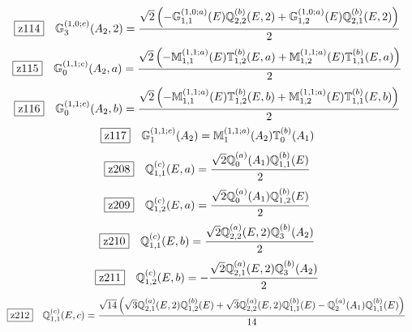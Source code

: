 \documentclass[fleqn,10pt,landscape]{jsarticle}
\begin{document}
\begin{dmath*}
\hspace*{3mm}\fbox{z114}\quad \mathbb{G}_{3}^{(1,0;c)}(A_{2},2)=\frac{\sqrt{2} \left(- \mathbb{G}_{1,1}^{(1,0;a)}(E) \mathbb{Q}_{2,2}^{(b)}(E,2) + \mathbb{G}_{1,2}^{(1,0;a)}(E) \mathbb{Q}_{2,1}^{(b)}(E,2)\right)}{2}
\end{dmath*}
\begin{dmath*}
\hspace*{3mm}\fbox{z115}\quad \mathbb{G}_{0}^{(1,1;c)}(A_{2},a)=\frac{\sqrt{2} \left(- \mathbb{M}_{1,1}^{(1,1;a)}(E) \mathbb{T}_{1,2}^{(b)}(E,a) + \mathbb{M}_{1,2}^{(1,1;a)}(E) \mathbb{T}_{1,1}^{(b)}(E,a)\right)}{2}
\end{dmath*}
\begin{dmath*}
\hspace*{3mm}\fbox{z116}\quad \mathbb{G}_{0}^{(1,1;c)}(A_{2},b)=\frac{\sqrt{2} \left(- \mathbb{M}_{1,1}^{(1,1;a)}(E) \mathbb{T}_{1,2}^{(b)}(E,b) + \mathbb{M}_{1,2}^{(1,1;a)}(E) \mathbb{T}_{1,1}^{(b)}(E,b)\right)}{2}
\end{dmath*}
\begin{dmath*}
\hspace*{3mm}\fbox{z117}\quad \mathbb{G}_{1}^{(1,1;c)}(A_{2})=\mathbb{M}_{1}^{(1,1;a)}(A_{2}) \mathbb{T}_{0}^{(b)}(A_{1})
\end{dmath*}
\begin{dmath*}
\hspace*{3mm}\fbox{z208}\quad \mathbb{Q}_{1,1}^{(c)}(E,a)=\frac{\sqrt{2} \mathbb{Q}_{0}^{(a)}(A_{1}) \mathbb{Q}_{1,1}^{(b)}(E)}{2}
\end{dmath*}
\begin{dmath*}
\hspace*{3mm}\fbox{z209}\quad \mathbb{Q}_{1,2}^{(c)}(E,a)=\frac{\sqrt{2} \mathbb{Q}_{0}^{(a)}(A_{1}) \mathbb{Q}_{1,2}^{(b)}(E)}{2}
\end{dmath*}
\begin{dmath*}
\hspace*{3mm}\fbox{z210}\quad \mathbb{Q}_{1,1}^{(c)}(E,b)=\frac{\sqrt{2} \mathbb{Q}_{2,2}^{(a)}(E,2) \mathbb{Q}_{3}^{(b)}(A_{2})}{2}
\end{dmath*}
\begin{dmath*}
\hspace*{3mm}\fbox{z211}\quad \mathbb{Q}_{1,2}^{(c)}(E,b)=- \frac{\sqrt{2} \mathbb{Q}_{2,1}^{(a)}(E,2) \mathbb{Q}_{3}^{(b)}(A_{2})}{2}
\end{dmath*}
\begin{dmath*}
\hspace*{3mm}\fbox{z212}\quad \mathbb{Q}_{1,1}^{(c)}(E,c)=\frac{\sqrt{14} \left(\sqrt{3} \mathbb{Q}_{2,1}^{(a)}(E,2) \mathbb{Q}_{1,2}^{(b)}(E) + \sqrt{3} \mathbb{Q}_{2,2}^{(a)}(E,2) \mathbb{Q}_{1,1}^{(b)}(E) - \mathbb{Q}_{2}^{(a)}(A_{1}) \mathbb{Q}_{1,1}^{(b)}(E)\right)}{14}
\end{dmath*}
\end{document}
